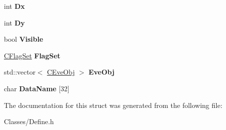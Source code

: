 \begin{DoxyCompactItemize}
\item 
int {\bfseries Dx}\hypertarget{structplaydata__tag_afbd0f88682d046acd1a896e064cc157b}{}\label{structplaydata__tag_afbd0f88682d046acd1a896e064cc157b}

\item 
int {\bfseries Dy}\hypertarget{structplaydata__tag_a0574ab388dad78bd9c40a2125717c6e1}{}\label{structplaydata__tag_a0574ab388dad78bd9c40a2125717c6e1}

\item 
bool {\bfseries Visible}\hypertarget{structplaydata__tag_a7172b1c4330eb858d646898116fc7d11}{}\label{structplaydata__tag_a7172b1c4330eb858d646898116fc7d11}

\item 
\hyperlink{class_c_flag_set}{C\+Flag\+Set} {\bfseries Flag\+Set}\hypertarget{structplaydata__tag_aec35284b6a85e346900aa7bf6781b4ac}{}\label{structplaydata__tag_aec35284b6a85e346900aa7bf6781b4ac}

\item 
std\+::vector$<$ \hyperlink{class_c_eve_obj}{C\+Eve\+Obj} $>$ {\bfseries Eve\+Obj}\hypertarget{structplaydata__tag_ab52fc1c0aa50892765d9fc04b690f0b7}{}\label{structplaydata__tag_ab52fc1c0aa50892765d9fc04b690f0b7}

\item 
char {\bfseries Data\+Name} \mbox{[}32\mbox{]}\hypertarget{structplaydata__tag_ae85951906fa3142ae9775b43e1ab1cb1}{}\label{structplaydata__tag_ae85951906fa3142ae9775b43e1ab1cb1}

\end{DoxyCompactItemize}


The documentation for this struct was generated from the following file\+:\begin{DoxyCompactItemize}
\item 
Classes/Define.\+h\end{DoxyCompactItemize}
